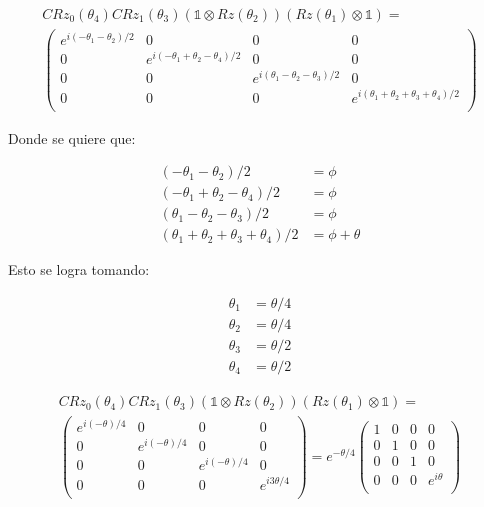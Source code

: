 \begin{multline}
    CRz_0(\theta_4) CRz_1(\theta_3) (\mathds{1} \otimes Rz(\theta_2)) (Rz(\theta_1) \otimes \mathds{1}) = \\
    \begin{pmatrix}
        e^{i(-\theta_1 - \theta_2)/2} & 0 & 0 & 0 \\
        0 & e^{i(-\theta_1+\theta_2-\theta_4)/2} & 0 & 0 \\
        0 & 0 & e^{i(\theta_1 - \theta_2 - \theta_3)/2} & 0 \\
        0 & 0 & 0 & e^{i(\theta_1 + \theta_2 + \theta_3 + \theta_4)/2} \\
    \end{pmatrix}
\end{multline}

Donde se quiere que:

\begin{align}
    (-\theta_1 - \theta_2)/2 &= \phi \\
    (-\theta_1+\theta_2-\theta_4)/2 &= \phi \\
    (\theta_1 - \theta_2 - \theta_3)/2 &= \phi \\
    (\theta_1 + \theta_2 + \theta_3 + \theta_4)/2 &= \phi + \theta
\end{align}

Esto se logra tomando:

\begin{align}
    \theta_1 &= \theta/4\\
    \theta_2 &= \theta/4\\
    \theta_3 &= \theta/2\\
    \theta_4 &= \theta/2
\end{align}

\begin{multline}
    CRz_0(\theta_4) CRz_1(\theta_3) (\mathds{1} \otimes Rz(\theta_2)) (Rz(\theta_1) \otimes \mathds{1}) = \\
    \begin{pmatrix}
        e^{i(-\theta)/4} & 0 & 0 & 0 \\
        0 & e^{i(-\theta)/4} & 0 & 0 \\
        0 & 0 & e^{i(- \theta)/4} & 0 \\
        0 & 0 & 0 & e^{i 3\theta/4} \\
    \end{pmatrix} =
    e^{- \theta/4} \begin{pmatrix}
        1 & 0 & 0 & 0 \\
        0 & 1 & 0 & 0 \\
        0 & 0 & 1 & 0 \\
        0 & 0 & 0 & e^{i \theta} \\
    \end{pmatrix}
\end{multline}

